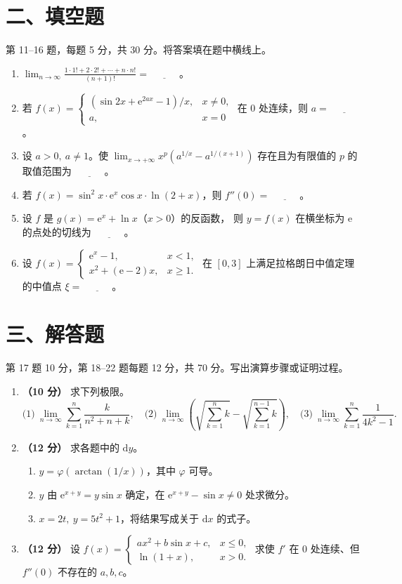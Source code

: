 \documentclass[UTF8,a4paper,zihao=-4,fontset=fandol]{ctexart}
\newcommand{\blank}{\underline{\hspace{3em}}}
\newcommand{\fillsection}{%
  \section*{二、填空题}
  第 11--16 题，每题 5 分，共 30 分。将答案填在题中横线上。}
\newcommand{\solvesection}{%
  \newpage
  \section*{三、解答题}
  第 17 题 10 分，第 18--22 题每题 12 分，共 70 分。写出演算步骤或证明过程。}
\begin{document}
\fillsection
\begin{enumerate}[start=11]
\item $\displaystyle\lim_{n\to\infty}\frac{1\cdot1!+2\cdot2!+\cdots+n\cdot n!}{(n+1)!}=\blank$。
\item 若 $f(x)=\begin{cases}(\sin 2x+\mathrm{e}^{2ax}-1)/x,&x\ne0,\\a,&x=0\end{cases}$
在 $0$ 处连续，则 $a=\blank$。
\item 设 $a>0,\ a\ne1$。使 $\displaystyle\lim_{x\to+\infty}x^p(a^{1/x}-a^{1/(x+1)})$
存在且为有限值的 $p$ 的取值范围为 $\blank$。
\item 若 $f(x)=\sin^2x\cdot\mathrm{e}^x\cos x\cdot\ln(2+x)$，则 $f''(0)=\blank$。
\item 设 $f$ 是 $g(x)=\mathrm{e}^x+\ln x$（$x>0$）的反函数，
则 $y=f(x)$ 在横坐标为 $\mathrm{e}$ 的点处的切线为 $\blank$。
\item 设 $f(x)=\begin{cases}\mathrm{e}^x-1,&x<1,\\x^2+(\mathrm{e}-2)x,&x\ge1.\end{cases}$
在 $[0,3]$ 上满足拉格朗日中值定理的中值点 $\xi=\blank$。
\end{enumerate}
\solvesection
\begin{enumerate}[start=17]
\item \textbf{（10 分）} 求下列极限。
\[
 \text{(1)}\ \lim_{n\to\infty}\sum_{k=1}^n\frac{k}{n^2+n+k},
 \quad
 \text{(2)}\ \lim_{n\to\infty}
 \left(\sqrt{\sum_{k=1}^n k}-\sqrt{\sum_{k=1}^{n-1}k}\right),
 \quad
 \text{(3)}\ \lim_{n\to\infty}\sum_{k=1}^n\frac{1}{4k^2-1}.
\]
\vspace{4.5cm}
\item \textbf{（12 分）} 求各题中的 $\mathrm{d}y$。
\begin{enumerate}[label=(\arabic*),nosep]
\item $y=\varphi(\arctan(1/x))$，其中 $\varphi$ 可导。
\item $y$ 由 $\mathrm{e}^{x+y}=y\sin x$ 确定，在 $\mathrm{e}^{x+y}-\sin x\ne0$ 处求微分。
\item $x=2t,\ y=5t^2+1$，将结果写成关于 $\mathrm{d}x$ 的式子。
\end{enumerate}
\vspace{4.5cm}
\item \textbf{（12 分）} 设 $f(x)=\begin{cases}ax^2+b\sin x+c,&x\le0,\\\ln(1+x),&x>0.\end{cases}$
求使 $f'$ 在 $0$ 处连续、但 $f''(0)$ 不存在的 $a,b,c$。
\end{enumerate}
\end{document}
